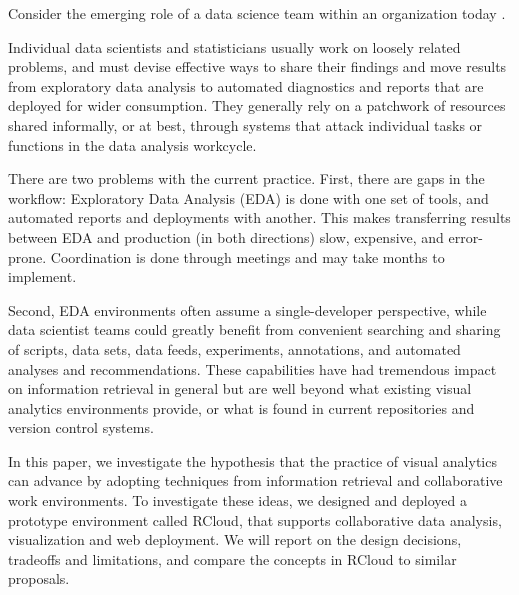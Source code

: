 

\maketitle


Consider the emerging role of a data science team within an
organization today \cite{Keim:2008:VAS}.

Individual data scientists and statisticians usually work on loosely
related problems, and must devise effective ways to share their findings
and move results from exploratory data analysis to automated diagnostics
and reports that are deployed for wider consumption.
They generally rely on a patchwork of resources shared informally,
or at best, through systems that attack individual tasks or functions
in the data analysis workcycle. %

There are two problems with the current
practice. First, there are gaps in the workflow:
Exploratory Data Analysis (EDA) is done with one set of tools,
and automated reports and deployments with another. This makes
transferring results between EDA and production (in both directions)
slow, expensive, and error-prone. Coordination is done through
meetings and may take months to implement.

Second, EDA environments often assume a single-developer perspective,
while data scientist teams could greatly benefit from convenient searching
and sharing of scripts, data sets, data feeds, experiments, annotations,
and automated analyses and recommendations. These capabilities have had
tremendous impact on information retrieval in general but are well
beyond what existing visual analytics environments provide, or what
is found in current repositories and version control systems.

 In this paper, we investigate the hypothesis
that the practice of visual analytics can advance by adopting techniques
from information retrieval and collaborative work environments. To investigate
these ideas, we designed and deployed a prototype environment called RCloud,
that supports collaborative data analysis, visualization and web deployment.
We will report on the design decisions, tradeoffs and limitations, and compare
the concepts in RCloud to similar proposals.

